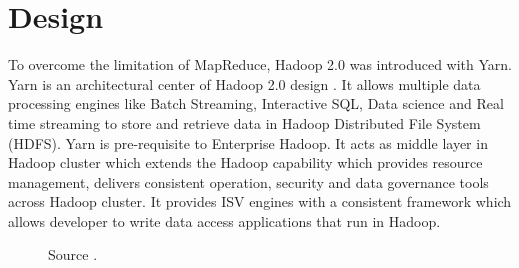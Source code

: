 \documentclass[9pt,twocolumn,twoside]{../../styles/osajnl}
\begin{document}
\section{Design}
To overcome the limitation of MapReduce, Hadoop 2.0 was introduced with Yarn. Yarn is an architectural center of Hadoop 2.0 design \cite{www-4}. It allows multiple data processing engines like Batch Streaming, Interactive SQL, Data science and Real time streaming to store and retrieve data in Hadoop Distributed File System (HDFS). Yarn is pre-requisite to Enterprise Hadoop. It acts as middle layer in Hadoop cluster which extends the Hadoop capability which provides resource management, delivers consistent operation, security and data governance tools across Hadoop cluster. It provides ISV engines with a consistent framework which allows developer to write data access applications that run in Hadoop. 

\begin{figure}[htbp]
	\centering
	\caption{Source \cite{www-4}. }
	\label{fig:false-color}
\end{figure}
\end{document}

